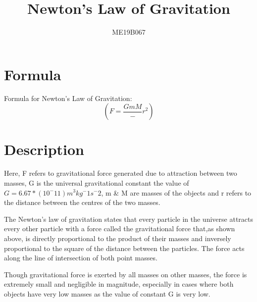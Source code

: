\documentclass{article}
\title{Newton's Law of Gravitation}
\author{ME19B067}
\begin{document}
\section{Formula}
Formula for Newton's Law of Gravitation: 
$$(F=\frac{GmM}-{r^2})$$
\section{Description}
Here, F refers to gravitational force generated due to attraction between two masses, G is the universal gravitational constant the value of $G=6.67*(10^-11)m^3kg^-1s^-2$, m & M are masses of the objects and r refers to the distance between the centres of the two masses.

The Newton's law of gravitation states that every particle in the universe attracts every other particle with a force called the gravitational force that,as shown above, is directly proportional to the product of their masses and inversely proportional to the square of the distance between the particles. The force acts along the line of intersection of both point masses. 

Though gravitational force is exerted by all masses on other masses, the force is extremely small and negligible in magnitude, especially in cases where both objects have very low masses as the value of constant G is very low. 
\end{document}
